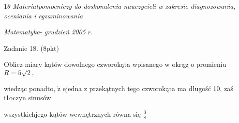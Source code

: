 \documentclass[a4paper,12pt]{article}
\begin{document}
$ 1\theta$ {\it Materiatpomocniczy do doskonalenia nauczycieli w zakresie diagnozowania, oceniania i egzaminowania}

{\it Matematyka}- {\it grudzień 2005} $r.$

Zadanie 18. (8pkt)

Oblicz miary kątów dowolnego czworokąta wpisanego w okrąg o promieniu $R=5\sqrt{2},$

wiedząc ponadto, $\dot{\mathrm{z}}$ ejedna z przekątnych tego czworokąta ma długość 10, zaś i1oczyn sinusów

wszystkichjego kątów wewnętrznych równa się $\displaystyle \frac{3}{8}$
\end{document}
